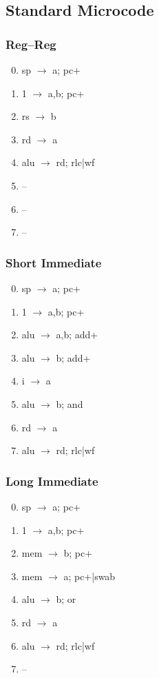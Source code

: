 \documentclass[11pt]{book}
\begin{document}
\subsection*{Standard Microcode}
\begin{multicols}{3}\ttfamily\selectfont\small
  \subsubsection*{Reg--Reg}
  \begin{enumerate}\setcounter{enumi}{-1}
  \item sp \(\rightarrow\) a; pc+
  \item 1 \(\rightarrow\) a,b; pc+
  \item rs \(\rightarrow\) b
  \item rd \(\rightarrow\) a
  \item alu \(\rightarrow\) rd; rlc|wf
  \item --
  \item --
  \item --
  \end{enumerate}
  \columnbreak
  \subsubsection*{Short Immediate}
  \begin{enumerate}\setcounter{enumi}{-1}
  \item sp \(\rightarrow\) a; pc+
  \item 1 \(\rightarrow\) a,b; pc+
  \item alu \(\rightarrow\) a,b; add+
  \item alu \(\rightarrow\) b; add+
  \item i \(\rightarrow\) a
  \item alu \(\rightarrow\) b; and
  \item rd \(\rightarrow\) a
  \item alu \(\rightarrow\) rd; rlc|wf
  \end{enumerate}
  \columnbreak
  \subsubsection*{Long Immediate}
  \begin{enumerate}\setcounter{enumi}{-1}
  \item sp \(\rightarrow\) a; pc+
  \item 1 \(\rightarrow\) a,b; pc+
  \item mem \(\rightarrow\) b; pc+
  \item mem \(\rightarrow\) a; pc+|swab
  \item alu \(\rightarrow\) b; or
  \item rd \(\rightarrow\) a
  \item alu \(\rightarrow\) rd; rlc|wf
  \item --
  \end{enumerate}
\end{multicols}
\end{document}
